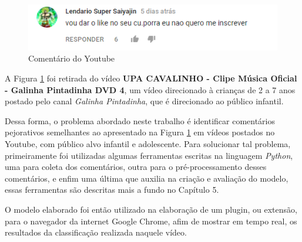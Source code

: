\begin{figure}[H] %
	\caption{\label{fig:youtube_comment} Comentário do Youtube}
	\begin{center}
	    \includegraphics[scale=1]{figuras/figura_1.png} %
	\end{center}
\end{figure}

A Figura \ref{fig:youtube_comment} foi retirada do vídeo \textbf{UPA CAVALINHO - Clipe Música Oficial - Galinha Pintadinha DVD 4}, um vídeo direcionado à crianças de 2 a 7 anos postado pelo canal \emph{Galinha Pintadinha}, que é direcionado ao público infantil. %


Dessa forma, o problema abordado neste trabalho é identificar comentários pejorativos semelhantes ao apresentado na Figura \ref{fig:youtube_comment} em vídeos postados no Youtube, com público alvo infantil e adolescente. Para solucionar tal problema, primeiramente foi utilizadas algumas ferramentas escritas na linguagem \textit{Python}, uma para coleta dos comentários, outra para o pré-processamento desses comentários, e enfim uma última que auxilia na criação e avaliação do modelo, essas ferramentas são descritas mais a fundo no Capítulo 5. 

O modelo elaborado foi então utilizado na elaboração de um plugin, ou extensão, para o navegador da internet Google Chrome, afim de mostrar em tempo real, os resultados da classificação realizada naquele vídeo.  %

